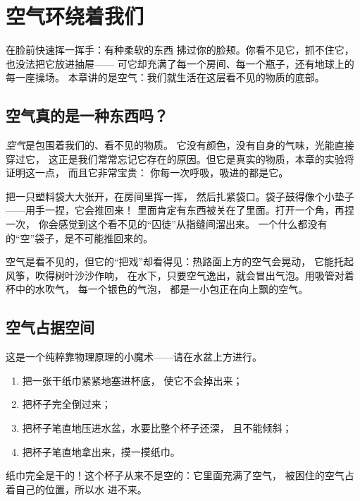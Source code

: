 \chapter{空气环绕着我们}\label{ch:g2:air-around-us}

在脸前快速挥一挥手：有种柔软的东西
拂过你的脸颊。你看不见它，抓不住它，也没法把它放进抽屉——
可它却充满了每一个房间、每一个瓶子，还有地球上的每一座操场。
本章讲的是空气：我们就生活在这层看不见的物质的底部。

\section{空气真的是一种东西吗？}

\begin{definition}[空气]\label{def:g2:air-around-us:air}
\emph{空气}是包围着我们的、看不见的物质。
它没有颜色，没有自身的气味，光能直接穿过它，
这正是我们常常忘记它存在的原因。但它是真实的物质，本章的实验将证明这一点，
而且它非常宝贵：
你每一次呼吸，吸进的都是它。
\end{definition}

\begin{example}\label{ex:g2:air-around-us:catch}
把一只塑料袋大大张开，在房间里挥一挥，
然后扎紧袋口。袋子鼓得像个小垫子——用手一捏，它会推回来！
里面肯定有东西被关在了里面。打开一个角，再捏一次，
你会感觉到这个看不见的“囚徒”从指缝间溜出来。
一个什么都没有的“空”袋子，是不可能推回来的。
\end{example}

\begin{example}[空气显露自己]\label{ex:g2:air-around-us:shows}
空气是看不见的，但它的“把戏”却看得见：热路面上方的空气会晃动，
它能托起风筝，吹得树叶沙沙作响，
在水下，只要空气逸出，就会冒出气泡。用吸管对着杯中的水吹气，
每一个银色的气泡，
都是一小包正在向上飘的空气。
\end{example}

\section{空气占据空间}

\begin{method}[干纸巾潜水]\label{met:g2:air-around-us:drytowel}
这是一个纯粹靠物理原理的小魔术——请在水盆上方进行。
\begin{enumerate}
  \item 把一张干纸巾紧紧地塞进杯底，
        使它不会掉出来；
  \item 把杯子完全倒过来；
  \item 把杯子笔直地压进水盆，水要比整个杯子还深，
        且不能倾斜；
  \item 把杯子笔直地拿出来，摸一摸纸巾。
\end{enumerate}
纸巾完全是干的！这个杯子从来不是空的：它里面充满了空气，
被困住的空气占着自己的位置，所以水
进不来。
\end{method}

